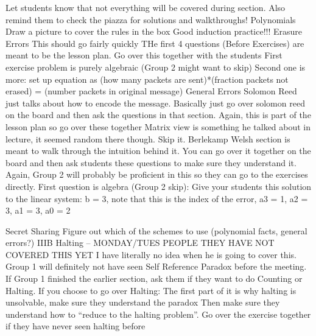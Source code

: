 Let students know that not everything will be covered during section. 
Also remind them to check the piazza for solutions and walkthroughs!
Polynomials
Draw a picture to cover the rules in the box
Good induction practice!!!
Erasure Errors
This should go fairly quickly
THe first 4 questions (Before Exercises) are meant to be the lesson plan. Go over this together with the students
First exercise problem is purely algebraic (Group 2 might want to skip)
Second one is more: set up equation as (how many packets are sent)*(fraction packets not erased) = (number packets in original message)
General Errors
Solomon Reed just talks about how to encode the message.
Basically just go over solomon reed on the board and then ask the questions in that section. Again, this is part of the lesson plan so go over these together
Matrix view is something he talked about in lecture, it seemed random there though. Skip it.
Berlekamp Welsh section is meant to walk through the intuition behind it. You can go over it together on the board and then ask students these questions to make sure they understand it. Again, Group 2 will probably be proficient in this so they can go to the exercises directly.
First question is algebra (Group 2 skip): Give your students this solution to the linear system: b = 3, note that this is the index of the error, a3 = 1, a2 = 3, a1 = 3, a0 = 2

Secret Sharing
Figure out which of the schemes to use (polynomial facts, general errors?)
IIIB	Halting -- MONDAY/TUES PEOPLE THEY HAVE NOT COVERED THIS YET
I have literally no idea when he is going to cover this. Group 1 will definitely not have seen Self Reference Paradox before the meeting. If Group 1 finished the earlier section, ask them if they want to do Counting or Halting.
If you choose to go over Halting:
The first part of it is why halting is unsolvable, make sure they understand the paradox
Then make sure they understand how to “reduce to the halting problem”. Go over the exercise together if they have never seen halting before
